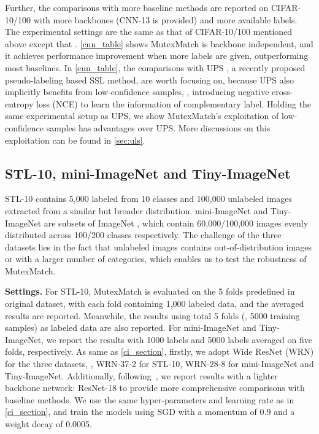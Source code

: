 \documentclass[lettersize,journal]{IEEEtran}
\theoremstyle{plain}
\theoremstyle{definition}
\theoremstyle{remark}
\begin{document}
Further, the comparisons with more baseline methods are reported on CIFAR-10/100 with more backbones (CNN-13 \cite{oliver2018realistic} is provided) and more available labels. 
The experimental settings are the same as that of CIFAR-10/100 mentioned above except that  .
\cref{cnn_table} shows MutexMatch is backbone independent, 
and it achieves performance improvement when more labels are given, outperforming most baselines. In \cref{cnn_table}, the comparisons with UPS \cite{rizve2021in}, a recently proposed pseudo-labeling based SSL method, are worth focusing on, because UPS also implicitly benefits from low-confidence samples, \ie, introducing negative cross-entropy
loss (NCE) to learn the information of complementary label. Holding the same experimental setup as UPS, we show MutexMatch's exploitation of low-confidence samples has advantages over UPS. More discussions on this exploitation can be found in \cref{sec:uls}.


\subsection{STL-10,  mini-ImageNet and Tiny-ImageNet}
 \vskip 0.03in
STL-10 contains 5,000 labeled from 10 classes and 100,000 unlabeled images extracted from a similar but broader distribution.  mini-ImageNet and Tiny-ImageNet are subsets of ImageNet \cite{deng2009imagenet}, which contain 60,000/100,000 images evenly distributed across 100/200 classes respectively.
The challenge of the three datasets lies in the fact that unlabeled images contains out-of-distribution images or with a larger number of categories, which enables us to test the robustness of MutexMatch.

\noindent\textbf{Settings.} For STL-10, MutexMatch is evaluated on the 5 folds predefined in original dataset, with each fold containing 1,000 labeled data, and the averaged results are reported. Meanwhile, the results using total 5 folds (\ie, 5000 training samples) as labeled data are also reported.
For mini-ImageNet and Tiny-ImageNet, we report the results with 1000 labels and 5000 labels averaged on five folds, respectively.
As same as \cref{ci_section}, firstly, we adopt Wide ResNet (WRN) for the three datasets, \ie, WRN-37-2 for STL-10, WRN-28-8 for mini-ImageNet and Tiny-ImageNet. Additionally, following~\cite{li2021comatch}, we report results with a lighter backbone network: ResNet-18 \cite{he2016deep} to provide more comprehensive comparisons with baseline methods.
We use the same hyper-parameters and learning rate as  in \cref{ci_section}, and train the models using SGD with a momentum of 0.9 and a weight decay of 0.0005.
\end{document}

